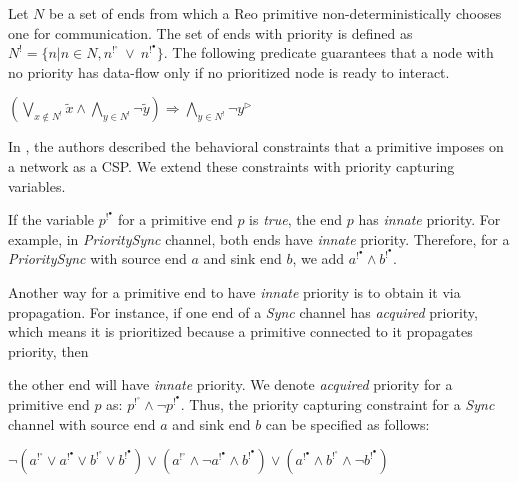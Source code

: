 \begin{axiom}\label{ax:chooserprio}
Let $N$ be a set of ends from which a Reo primitive non-deterministically chooses one for communication. The set of ends with priority is defined as $N^!=\{n | n \in N, n^{!^\circ}\ \vee\ n^{!^\bullet}\}$. The following predicate guarantees that a node with no priority has data-flow only if no prioritized node is ready to interact.

$(\bigvee_{x \notin N^!} \tilde{x} \wedge \bigwedge_{y \in N^!} \neg \tilde{y})  \Rightarrow \bigwedge_{y \in N^!} \neg y^\triangleright $
\end{axiom}

%
In \cite{behconstraint}, the authors described the behavioral constraints that a primitive imposes on a network as a CSP. We extend these constraints with priority capturing variables. 

%
If the variable $p^{!^\bullet}$ for a primitive end $p$ is \emph{true}, the end $p$ has \emph{innate} priority. For example, in \emph{PrioritySync} channel, both ends have \emph{innate} priority. Therefore, for a \emph{PrioritySync} with source end $a$ and sink end $b$, we add $a^{!^\bullet} \wedge b^{!^\bullet}$. %

Another way for a primitive end to have \emph{innate} priority is to obtain it via propagation. For instance, if one end of a \emph{Sync} channel has \emph{acquired} priority, which means it is prioritized because a primitive connected to it propagates priority, then



the other end will have \emph{innate} priority. We denote \emph{acquired} priority for a primitive end $p$ as: $p^{!^\circ} \wedge \neg p^{!^\bullet}$. Thus, the priority capturing constraint for a \emph{Sync} channel with source end $a$ and sink end $b$ can be specified as follows:

$\neg(a^{!^\circ} \vee a^{!^\bullet} \vee b^{!^\circ} \vee b^{!^\bullet}) \vee (a^{!^\circ} \wedge \neg a^{!^\bullet} \wedge b^{!^\bullet}) \vee (a^{!^\bullet} \wedge b^{!^\circ} \wedge \neg b^{!^\bullet}) $

